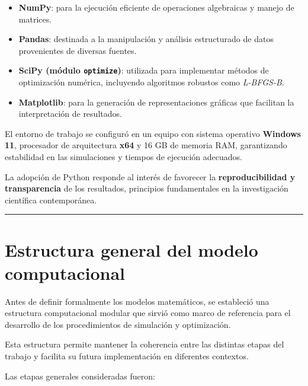 \documentclass[
  spanish,
  us-letterpaper,
  DIV=11,
  numbers=noendperiod]{scrreprt}
\providecommand{\tightlist}{%
  \setlength{\itemsep}{0pt}\setlength{\parskip}{0pt}}
\numberwithin{equation}{section}
\begin{document}
\begin{itemize}
\tightlist
\item
  \textbf{NumPy}: para la ejecución eficiente de operaciones algebraicas
  y manejo de matrices.\\
\item
  \textbf{Pandas}: destinada a la manipulación y análisis estructurado
  de datos provenientes de diversas fuentes.\\
\item
  \textbf{SciPy (módulo \texttt{optimize})}: utilizada para implementar
  métodos de optimización numérica, incluyendo algoritmos robustos como
  \emph{L-BFGS-B}.\\
\item
  \textbf{Matplotlib}: para la generación de representaciones gráficas
  que facilitan la interpretación de resultados.
\end{itemize}

El entorno de trabajo se configuró en un equipo con sistema operativo
\textbf{Windows 11}, procesador de arquitectura \textbf{x64} y 16 GB de
memoria RAM, garantizando estabilidad en las simulaciones y tiempos de
ejecución adecuados.

La adopción de Python responde al interés de favorecer la
\textbf{reproducibilidad y transparencia} de los resultados, principios
fundamentales en la investigación científica contemporánea.

\begin{center}\rule{0.5\linewidth}{0.5pt}\end{center}

\section{Estructura general del modelo
computacional}\label{estructura-general-del-modelo-computacional}

Antes de definir formalmente los modelos matemáticos, se estableció una
estructura computacional modular que sirvió como marco de referencia
para el desarrollo de los procedimientos de simulación y optimización.

Esta estructura permite mantener la coherencia entre las distintas
etapas del trabajo y facilita su futura implementación en diferentes
contextos.

Las etapas generales consideradas fueron:
\end{document}
